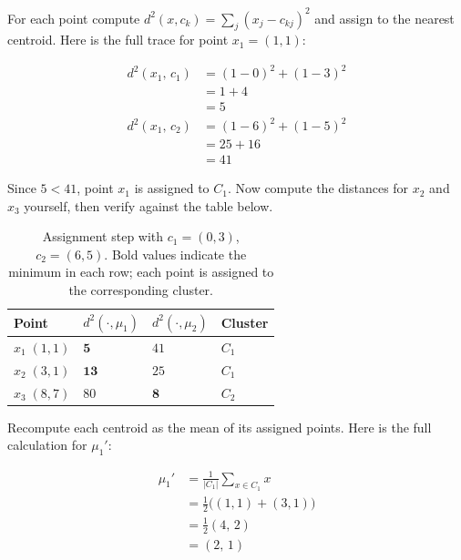 \vspace{0.5em}

 For each point compute $d^2(x,c_k)=\sum_j(x_j-c_{kj})^2$ and assign to the nearest centroid.
Here is the full trace for point $x_1{=}(1,1)$:

\begin{align*}
    d^2(x_1,\,c_1) &= (1-0)^2 + (1-3)^2 \\
                     &= 1 + 4 \\
                     &= 5 \\[6pt]
    d^2(x_1,\,c_2) &= (1-6)^2 + (1-5)^2 \\
                     &= 25 + 16 \\
                     &= 41
\end{align*}

Since $5 < 41$, point $x_1$ is assigned to $C_1$.
Now compute the distances for $x_2$ and $x_3$ yourself, then verify against the table below.

\vspace{2.5em}
\begin{table}[ht]
\centering
\begin{tabular}{p{}p{}p{}p{}}
    \toprule
    \textbf{Point} & \textbf{$d^2(\cdot,\mu_1)$} & \textbf{$d^2(\cdot,\mu_2)$} & \textbf{Cluster} \\
    \midrule
    $x_1\;(1,1)$ & $\mathbf{5}$  & $41$         & $C_1$ \\
    $x_2\;(3,1)$ & $\mathbf{13}$ & $25$         & $C_1$ \\
    $x_3\;(8,7)$ & $80$          & $\mathbf{8}$ & $C_2$ \\
    \bottomrule
\end{tabular}
\vspace{2em}
\caption{Assignment step with $c_1{=}(0,3)$, $c_2{=}(6,5)$. Bold values indicate the minimum in each row; each point is assigned to the corresponding cluster.}
\label{tab:assignment}
\end{table}


\newpage
{} Recompute each centroid as the mean of its assigned points.
Here is the full calculation for $\mu_1'$:

\begin{align*}
    \mu_1' &= \frac{1}{|C_1|}\sum_{x \in C_1} x \\
           &= \tfrac{1}{2}\bigl((1,1)+(3,1)\bigr) \\
           &= \tfrac{1}{2}(4,\,2) \\
           &= (2,\,1)
\end{align*}

